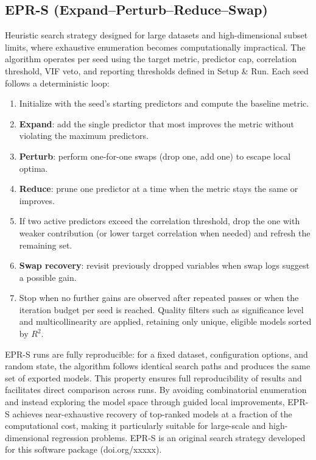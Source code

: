 \documentclass[11pt,a4paper]{article}
\begin{document}
\subsection{EPR-S (Expand--Perturb--Reduce--Swap)}

Heuristic search strategy designed for large datasets and high-dimensional subset limits, where exhaustive enumeration becomes computationally impractical. The algorithm operates per seed using the target metric, predictor cap, correlation threshold, VIF veto, and reporting thresholds defined in Setup \& Run. Each seed follows a deterministic loop:

\begin{enumerate}
  \item Initialize with the seed's starting predictors and compute the baseline metric.
  \item \textbf{Expand}: add the single predictor that most improves the metric without violating the maximum predictors.
  \item \textbf{Perturb}: perform one-for-one swaps (drop one, add one) to escape local optima.
  \item \textbf{Reduce}: prune one predictor at a time when the metric stays the same or improves.
  \item If two active predictors exceed the correlation threshold, drop the one with weaker contribution (or lower target correlation when needed) and refresh the remaining set.
  \item \textbf{Swap recovery}: revisit previously dropped variables when swap logs suggest a possible gain.
  \item Stop when no further gains are observed after repeated passes or when the iteration budget per seed is reached. Quality filters such as significance level and multicollinearity are applied, retaining only unique, eligible models sorted by $R^2$.
\end{enumerate}

\medskip
EPR-S runs are fully reproducible: for a fixed dataset, configuration options, and random state, the algorithm follows identical search paths and produces the same set of exported models. This property ensures full reproducibility of results and facilitates direct comparison across runs. By avoiding combinatorial enumeration and instead exploring the model space through guided local improvements, EPR-S achieves near-exhaustive recovery of top-ranked models at a fraction of the computational cost, making it particularly suitable for large-scale and high-dimensional regression problems. EPR-S is an original search strategy developed for this software package (doi.org/xxxxx).
\end{document}
